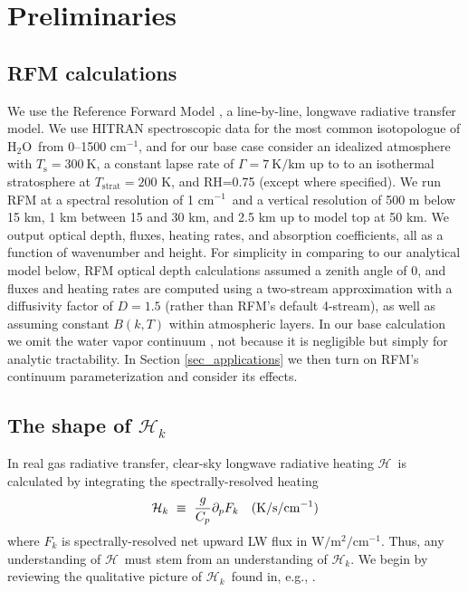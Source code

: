 \documentclass{ametsoc}
\newcommand{\beqn}{\begin{equation}}
\newcommand{\eeqn}{\end{equation}}
\newcommand{\Kelvin}{\ensuremath{\mathrm{K}}}
\newcommand{\km}{\ensuremath{\mathrm{km}}}
\newcommand{\Wmsq}{\ensuremath{\mathrm{W/m^2}}}
\newcommand{\cminverse}{\ensuremath{\mathrm{cm^{-1}}}}
\newcommand{\ppp}{\ensuremath{\partial_p}}
\newcommand{\Cp}{\ensuremath{C_p}}
\newcommand{\Ts}{\ensuremath{T_\mathrm{s}}}
\newcommand{\htwo}{\ensuremath{\mathrm{H_2O}}}
\newcommand{\RH}{\ensuremath{\mathrm{RH}}}
\newcommand{\ch}{\ensuremath{\mathcal{H}}}
\newcommand{\chk}{\ensuremath{\ch_k}}
\newcommand{\Tstrat}{\ensuremath{T_{\mathrm{strat}}}}
\begin{document}
\section{Preliminaries}\label{sec_preliminaries}

\subsection{RFM calculations} \label{sec_rfm_calcs}
We use the Reference Forward Model \citep[RFM,][]{dudhia2017}, a line-by-line, longwave radiative transfer model. We use HITRAN spectroscopic data for the most common isotopologue of \htwo\ from 0--1500 \cminverse, and for our base case consider an idealized atmosphere with $\Ts=300\ \Kelvin$,  a constant lapse rate of $\Gamma= 7\ \Kelvin/\km$ up to to an isothermal stratosphere at $\Tstrat=200$ K, and \RH=0.75 (except where specified). We run RFM at a spectral resolution of 1 \cminverse\ and a vertical resolution of 500 m below 15 km, 1 km between 15 and 30 km, and 2.5 km up to model top at 50 km. We output optical depth, fluxes, heating rates, and absorption coefficients, all as a function of wavenumber and height. For simplicity in comparing to our analytical model below, RFM optical depth calculations assumed a zenith angle of 0, and fluxes and heating rates are computed using a two-stream approximation with a diffusivity factor of $D=1.5$ (rather than RFM's default 4-stream), as well as assuming constant $B(k,T)$ within atmospheric layers.  In our base calculation we omit the water vapor continuum \citep{shine2012}, not because it is negligible but simply for analytic tractability. In Section \ref{sec_applications} we then turn on RFM's continuum parameterization \citep[MT\_CKD,][]{mlawer2012} and  consider its effects.

\subsection{The shape of \chk}
In real gas radiative transfer, clear-sky longwave radiative heating \ch\ is calculated by  integrating the spectrally-resolved heating 
\beqn
	\ch_k \ \equiv \ \frac{g}{\Cp} \ppp F_k \quad \text{(K/s/\cminverse)}
	\label{heat_k}
\eeqn
where $F_k$ is spectrally-resolved net upward LW flux in $\Wmsq/\cminverse$. Thus,  any understanding of \ch\ must stem from an understanding of \chk. We begin by reviewing the qualitative picture of \chk\  found in, e.g., \cite{clough1992}.
\end{document}
